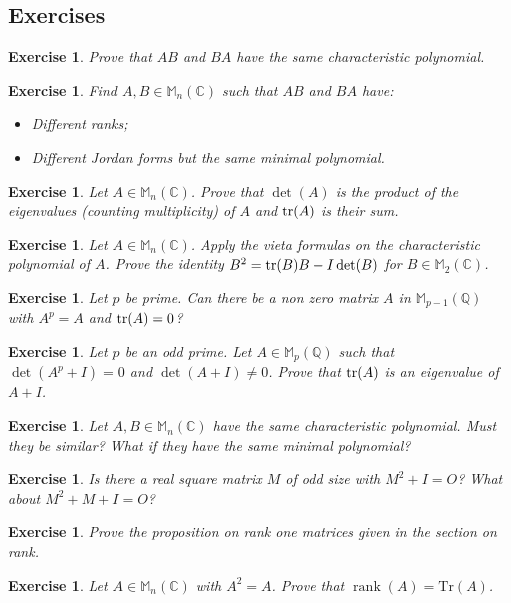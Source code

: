 \documentclass[12pt]{article}
\renewcommand{\Tr}{\mathrm{Tr}}
\DeclareMathOperator{\Rank}{rank}
\theoremstyle{breakplain}
\theoremstyle{breakdef}
\newtheorem{ex}[subsubsection]{Exercise}
\theoremstyle{remark}
\begin{document}
\subsection{Exercises}
\begin{ex}
    Prove that $AB$ and $BA$ have the same characteristic polynomial.
\end{ex}
\begin{ex}
    Find $A,B\in\mathbb{M}_n(\mathbb{C})$ such that $AB$ and $BA$ have:
    \begin{itemize}
        \item Different ranks;
        \item Different Jordan forms but the same minimal polynomial.
    \end{itemize}
\end{ex}
\begin{ex}
   Let $A\in\mathbb{M}_n(\mathbb{C})$. Prove that $\det(A)$ is the product of the eigenvalues (counting multiplicity) of $A$ and $\tr(A)$ is their sum.
\end{ex}
\begin{ex}
    Let $A\in\mathbb{M}_n(\mathbb{C})$. Apply the vieta formulas on the characteristic polynomial of $A$. Prove the identity $B^2=\tr(B)B-I\det(B)$ for $B\in \mathbb{M}_2(\mathbb{C})$.
\end{ex}
\begin{ex}
    Let $p$ be prime. Can there be a non zero matrix $A$ in $\mathbb{M}_{p-1}(\mathbb{Q})$ with $A^p=A$ and $\tr(A)=0$?
\end{ex}
\begin{ex}\label{P}
    Let $p$ be an odd prime. Let $A\in\mathbb{M}_p(\mathbb{Q})$ such that $\det(A^p+I)=0$ and $\det(A+I)\neq 0$. Prove that $\tr(A)$ is an eigenvalue of $A+I$.
\end{ex}
\begin{ex}
    Let $A,B \in \mathbb{M}_n(\mathbb{C})$ have the same characteristic polynomial. Must they be similar? What if they have the same minimal polynomial?
\end{ex}
\begin{ex}
    Is there a real square matrix $M$ of odd size with $M^2+I=O$? What about $M^2+M+I=O$?
\end{ex}
\begin{ex}
    Prove the proposition on rank one matrices given in the section on rank.
\end{ex}
\begin{ex}
    Let $A\in \mathbb{M}_n(\mathbb{C})$ with $A^2=A$. Prove that $\Rank(A)=\Tr(A)$.
\end{ex}
\end{document}
